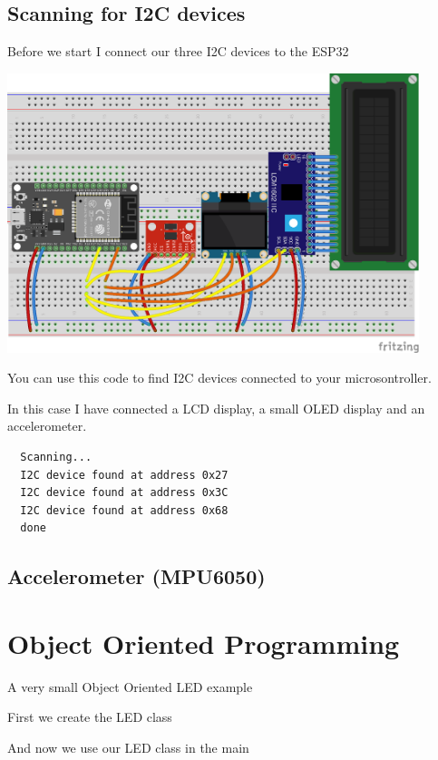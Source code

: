 \documentclass[12pt, a4paper]{article}
\begin{document}
\subsection{Scanning for I2C devices}

Before we start I connect our three I2C devices to the ESP32 

\begin{center}
  \includegraphics[width=12cm, keepaspectratio]{fritzing/i2c_devices.png}
\end{center}

You can use this code to find I2C devices connected to your microsontroller.



In this case I have connected a LCD display, a small OLED display and an accelerometer.

\begin{lstlisting}
  Scanning...
  I2C device found at address 0x27
  I2C device found at address 0x3C
  I2C device found at address 0x68
  done
\end{lstlisting}

\subsection{Accelerometer (MPU6050)}



\section{Object Oriented Programming}

A very small Object Oriented LED example

First we create the LED class



And now we use our LED class in the main


\end{document}
